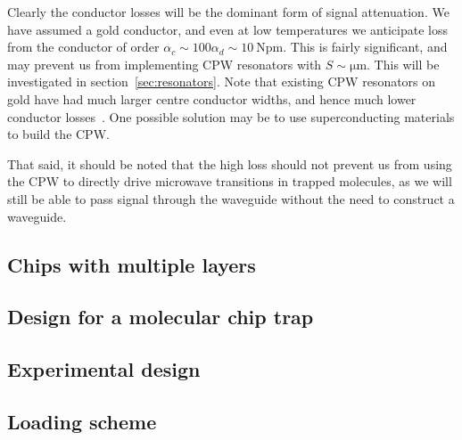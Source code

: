 Clearly the conductor losses will be the dominant form of signal attenuation. We
have assumed a gold conductor, and even at low temperatures we anticipate loss
from the conductor of order $\alpha_c \sim 100 \alpha_d \sim
\SI{10}{\neper\meter}$. This is fairly significant, and may prevent us from
implementing CPW resonators with $S\sim\si{\micro\meter}$. This will be
investigated in section~\ref{sec:resonators}. Note that existing
CPW resonators on gold have had much larger centre conductor widths, and hence
much lower conductor losses~\cite{1127105}. One possible solution may be to use
superconducting materials to build the CPW.

That said, it should be noted that the high loss should not prevent us from
using the CPW to directly drive microwave transitions in trapped molecules, as
we will still be able to pass signal through the waveguide without the need to
construct a waveguide.

\subsection{Chips with multiple layers}



\subsection{Design for a molecular chip trap}

\subsection{Experimental design}

\subsection{Loading scheme}
